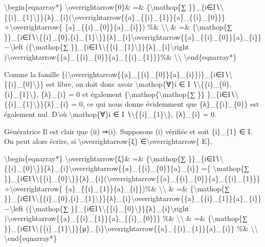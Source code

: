 \documentclass[]{article}
\begin{document}
\textbackslash{}begin\{eqnarray*\} \textbackslash{}overrightarrow\{0\}\&
=\& \{\textbackslash{}mathop\{∑
\}\}\_\{i∈I∖\textbackslash{}\{\{i\}\_\{1\}\textbackslash{}\}\}\{λ\}\_\{i\}(\textbackslash{}overrightarrow\{\{a\}\_\{\{i\}\_\{1\}\}\{a\}\_\{\{i\}\_\{0\}\}\}
+\textbackslash{}overrightarrow\{ \{a\}\_\{\{i\}\_\{0\}\}\{a\}\_\{i\}\})
\%\& \textbackslash{}\textbackslash{} \& =\& \{\textbackslash{}mathop\{∑
\}\}\_\{i∈I∖\textbackslash{}\{\{i\}\_\{0\},\{i\}\_\{1\}\textbackslash{}\}\}\{λ\}\_\{i\}\textbackslash{}overrightarrow\{\{a\}\_\{\{i\}\_\{0\}\}\{a\}\_\{i\}\}
−\textbackslash{}left (\{\textbackslash{}mathop\{∑
\}\}\_\{i∈I∖\textbackslash{}\{\{i\}\_\{1\}\textbackslash{}\}\}\{λ\}\_\{i\}\textbackslash{}right
)\textbackslash{}overrightarrow\{\{a\}\_\{\{i\}\_\{0\}\}\{a\}\_\{\{i\}\_\{1\}\}\}\%\&
\textbackslash{}\textbackslash{} \textbackslash{}end\{eqnarray*\}

Comme la famille
\{(\textbackslash{}overrightarrow\{\{a\}\_\{\{i\}\_\{0\}\}\{a\}\_\{i\}\})\}\_\{i∈I∖\textbackslash{}\{\{i\}\_\{0\}\textbackslash{}\}\}
est libre, on doit donc avoir \textbackslash{}mathop\{∀\}i ∈ I
∖\textbackslash{}\{\{i\}\_\{0\},\{i\}\_\{1\}\textbackslash{}\},
\{λ\}\_\{i\} = 0 et également
\{\textbackslash{}mathop\{\textbackslash{}mathop\{∑ \}\}
\}\_\{i∈I∖\textbackslash{}\{\{i\}\_\{1\}\textbackslash{}\}\}\{λ\}\_\{i\}
= 0, ce qui nous donne évidemment que \{λ\}\_\{\{i\}\_\{0\}\} est
également nul. D'où \textbackslash{}mathop\{∀\}i ∈ I
∖\textbackslash{}\{\{i\}\_\{1\}\textbackslash{}\}, \{λ\}\_\{i\} = 0.

Génératrice Il est clair que (ii) ⇒(i). Supposons (i) vérifiée et soit
\{i\}\_\{1\} ∈ I. On peut alors écrire, si
\textbackslash{}overrightarrow\{ξ\} ∈\textbackslash{}overrightarrow\{
E\},

\textbackslash{}begin\{eqnarray*\} \textbackslash{}overrightarrow\{ξ\}\&
=\& \{\textbackslash{}mathop\{∑
\}\}\_\{i∈I∖\textbackslash{}\{\{i\}\_\{0\}\textbackslash{}\}\}\{λ\}\_\{i\}\textbackslash{}overrightarrow\{\{a\}\_\{\{i\}\_\{0\}\}\{a\}\_\{i\}\}
=\{ \textbackslash{}mathop\{∑
\}\}\_\{i∈I∖\textbackslash{}\{\{i\}\_\{0\}\textbackslash{}\}\}\{λ\}\_\{i\}(\textbackslash{}overrightarrow\{\{a\}\_\{\{i\}\_\{0\}\}\{a\}\_\{\{i\}\_\{1\}\}\}
+\textbackslash{}overrightarrow\{
\{a\}\_\{\{i\}\_\{1\}\}\{a\}\_\{i\}\})\%\&
\textbackslash{}\textbackslash{} \& =\& \{\textbackslash{}mathop\{∑
\}\}\_\{i∈I∖\textbackslash{}\{\{i\}\_\{0\},\{i\}\_\{1\}\textbackslash{}\}\}\{λ\}\_\{i\}\textbackslash{}overrightarrow\{\{a\}\_\{\{i\}\_\{1\}\}\{a\}\_\{i\}\}
−\textbackslash{}left (\{\textbackslash{}mathop\{∑
\}\}\_\{i∈I∖\textbackslash{}\{\{i\}\_\{0\}\textbackslash{}\}\}\{λ\}\_\{i\}\textbackslash{}right
)\textbackslash{}overrightarrow\{\{a\}\_\{\{i\}\_\{1\}\}\{a\}\_\{\{i\}\_\{0\}\}\}
\%\& \textbackslash{}\textbackslash{} \& =\& \{\textbackslash{}mathop\{∑
\}\}\_\{i∈I∖\textbackslash{}\{\{i\}\_\{1\}\textbackslash{}\}\}\{μ\}\_\{i\}\textbackslash{}overrightarrow\{\{a\}\_\{\{i\}\_\{1\}\}\{a\}\_\{i\}\}
\%\& \textbackslash{}\textbackslash{} \textbackslash{}end\{eqnarray*\}
\end{document}
